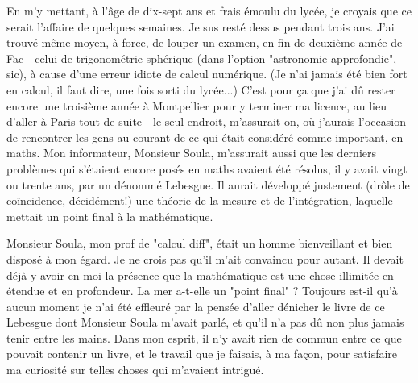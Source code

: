 En m'y mettant, à l'âge de dix-sept ans et frais émoulu du lycée, je croyais que ce serait l'affaire de quelques semaines. Je sus resté dessus pendant trois ans. J'ai trouvé même moyen, à force, de louper un examen, en fin de deuxième année de Fac - celui de trigonométrie sphérique (dans l'option "astronomie approfondie", sic), à cause d'une erreur idiote de calcul numérique. (Je n'ai jamais été bien fort en calcul, il faut dire, une fois sorti du lycée...) C'est pour ça que j'ai dû rester encore une troisième année à Montpellier pour y terminer ma licence, au lieu d'aller à Paris tout de suite - le seul endroit, m'assurait-on, où j'aurais l'occasion de rencontrer les gens au courant de ce qui était considéré comme important, en maths. Mon informateur, Monsieur Soula, m'assurait aussi que les derniers problèmes qui s'étaient encore posés en maths avaient été résolus, il y avait vingt ou trente ans, par un dénommé Lebesgue. Il aurait développé justement (drôle de coïncidence, décidément!) une théorie de la mesure et de l'intégration, laquelle mettait un point final à la mathématique.

Monsieur Soula, mon prof de "calcul diff", était un homme bienveillant et bien disposé à mon égard. Je ne crois pas qu'il m'ait convaincu pour autant. Il devait déjà y avoir en moi la présence que la mathématique est une chose illimitée en étendue et en profondeur. La mer a-t-elle un "point final" ? Toujours est-il qu'à aucun moment je n'ai été effleuré par la pensée d'aller dénicher le livre de ce Lebesgue dont Monsieur Soula m'avait parlé, et qu'il n'a pas dû non plus jamais tenir entre les mains. Dans mon esprit, il n'y avait rien de commun entre ce que pouvait contenir un livre, et le travail que je faisais, à ma façon, pour satisfaire ma curiosité sur telles choses qui m'avaient intrigué.



